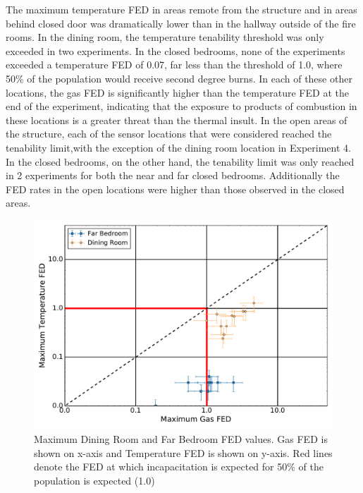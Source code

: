 \documentclass[12pt,oneside]{article}
\begin{document}
The maximum temperature FED in areas remote from the structure and in areas behind closed door was dramatically lower than in the hallway outside of the fire rooms. In the dining room, the temperature tenability threshold was only exceeded in two experiments. In the closed bedrooms, none of the experiments exceeded a temperature FED of 0.07, far less than the threshold of 1.0, where 50\% of the population would receive second degree burns. In each of these other locations, the gas FED is significantly higher than the temperature FED at the end of the experiment, indicating that the exposure to products of combustion in these locations is a greater threat than the thermal insult. In the open areas of the structure, each of the sensor locations that were considered reached the tenability limit,with the exception of the dining room location in Experiment 4. In the closed bedrooms, on the other hand, the tenability limit was only reached in 2 experiments for both the near and far closed bedrooms. Additionally the FED rates in the open locations were higher than those observed in the closed areas.
\begin{figure}[!ht]
	\centering
	\includegraphics[width=.75\textwidth]{../Figures/br_compare/Far}
	\caption[Maximum Dining Room and Far Bedroom FED values]{Maximum Dining Room and Far Bedroom FED values. Gas FED is shown on x-axis and Temperature FED is shown on y-axis. Red lines denote the FED at which incapacitation is expected for 50\% of the population is expected (1.0)}
	\label{fig:far_FED_compare}
\end{figure}

\end{document}
